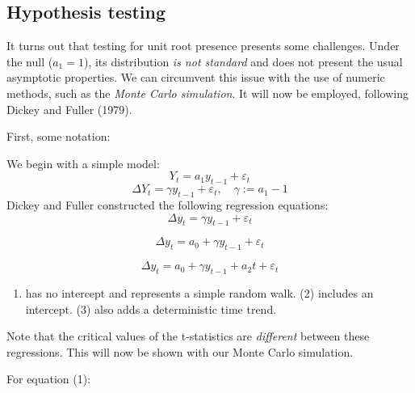 \documentclass[11pt, a4paper]{report}
\providecommand{\tightlist}{%
	\setlength{\itemsep}{0pt}\setlength{\parskip}{0pt}}
\theoremstyle{plain}
\theoremstyle{plain}
\theoremstyle{remark}
\begin{document}
\subsection{Hypothesis testing}

It turns out that testing for unit root presence presents some
challenges. Under the null (\(a_1 = 1\)), its distribution \emph{is not
standard} and does not present the usual asymptotic properties. We can
circumvent this issue with the use of numeric methods, such as the
\emph{Monte Carlo simulation}. It will now be employed, following Dickey
and Fuller (1979).

First, some notation:

We begin with a simple model: \[ Y_t = a_1 y_{t-1} + \varepsilon_t \]
\[ \Delta Y_t = \gamma y_{t-1} + \varepsilon_t, \hspace{1em} \gamma := a_1 - 1 \]
Dickey and Fuller constructed the following regression equations:
\begin{equation}
 \Delta y_t = \gamma y_{t-1} + \varepsilon_t
\end{equation}

\begin{equation}
\Delta y_t = a_0 + \gamma y_{t-1} + \varepsilon_t
\end{equation}

\begin{equation}
\Delta y_t = a_0 + \gamma y_{t-1} + a_2t + \varepsilon_t
\end{equation}

\begin{enumerate}
\def\labelenumi{(\arabic{enumi})}
\tightlist
\item
  has no intercept and represents a simple random walk. (2) includes an
  intercept. (3) also adds a deterministic time trend.
\end{enumerate}

Note that the critical values of the t-statistics are \emph{different}
between these regressions. This will now be shown with our Monte Carlo
simulation.

For equation (1):
\end{document}
